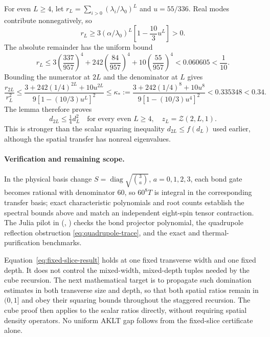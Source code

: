 \documentclass[11pt]{article}
\begin{document}
For even \(L\ge4\), let
\(r_L=\sum_{i>0}(\lambda_i/\lambda_0)^L\) and
\(u=55/336\). Real modes contribute nonnegatively, so
\[
	r_L\ge3(\alpha/\lambda_0)^L
	\left[1-\frac{10}{3}u^L\right]>0.
\]
The absolute remainder has the uniform bound
\[
	r_L\le3\left(\frac{337}{957}\right)^4
	+242\left(\frac{84}{957}\right)^4
	+10\left(\frac{55}{957}\right)^4
	<0.060605<\frac1{10}.
\]
Bounding the numerator at \(2L\) and the denominator at \(L\) gives
\[
	\frac{r_{2L}}{r_L^2}
	\le
	\frac{3+242(1/4)^{2L}+10u^{2L}}
	{9[1-(10/3)u^L]^2}
	\le\kappa_*:=
	\frac{3+242(1/4)^8+10u^8}
	{9[1-(10/3)u^4]^2}
	<0.335348<0.34.
\]
The lemma therefore proves
\begin{equation}
	\boxed{d_{2L}\le\tfrac14d_L^2
		\quad\text{for every even }L\ge4,
		\quad z_L=\mathcal Z(2,L,1).}
	\label{eq:fixed-slice-result}
\end{equation}
This is stronger than the scalar squaring inequality
\(d_{2L}\le f(d_L)\) used earlier, although the spatial transfer
has nonreal eigenvalues.

\paragraph{Verification and remaining scope.}
In the physical basis change \(S=\operatorname{diag}\sqrt{\binom3a}\),
\(a=0,1,2,3\), each bond gate becomes rational with denominator 60, so
\(60^8T\) is integral in the corresponding transfer basis; exact
characteristic polynomials and root counts establish the spectral bounds above
and match an independent eight-spin tensor contraction. The Julia pilot in
 (, ) checks the
bond projector polynomial, the quadrupole reflection obstruction
\eqref{eq:quadrupole-trace}, and the exact and thermal-purification benchmarks.

Equation~\eqref{eq:fixed-slice-result} holds at one fixed transverse
width and one fixed depth. It does not control the mixed-width,
mixed-depth tuples needed by the cube recursion. The next mathematical
target is to propagate such domination estimates in both transverse
size and depth, so that both spatial ratios remain in \((0,1]\) and
obey their squaring bounds throughout the staggered recursion.
The cube proof then applies to the scalar ratios directly, without
requiring spatial density operators. No uniform AKLT gap follows from
the fixed-slice certificate alone.
\end{document}
